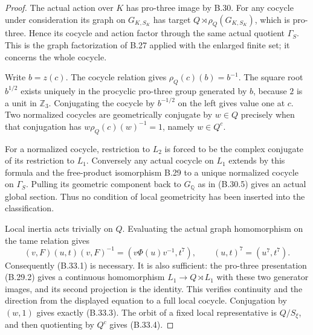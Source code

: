 \begin{proof}
The actual action over $K$ has pro-three image by B.30.
For any cocycle under consideration its graph on
$G_{K,S_K}$ has target $Q\rtimes\rho_Q(G_{K,S_K})$,
which is pro-three.  Hence its cocycle and action factor
through the same actual quotient $\Gamma_S$.
This is the graph factorization of B.27 applied with the
enlarged finite set; it concerns the whole cocycle.

Write $b=z(c)$.  The cocycle relation gives
$\rho_Q(c)(b)=b^{-1}$.  The square root $b^{1/2}$ exists
uniquely in the procyclic pro-three group generated by
$b$, because $2$ is a unit in $\mathbb Z_3$.
Conjugating the cocycle by $b^{-1/2}$ on the left gives
value one at $c$.  Two normalized cocycles are
geometrically conjugate by $w\in Q$ precisely when
that conjugation has $w\rho_Q(c)(w)^{-1}=1$, namely
$w\in Q^c$.

For a normalized cocycle, restriction to $L_2$ is forced
to be the complex conjugate of its restriction to $L_1$.
Conversely any actual cocycle on $L_1$ extends by this
formula and the free-product isomorphism B.29 to a unique
normalized cocycle on $\Gamma_S$.  Pulling its geometric
component back to $G_{\mathbb Q}$ as in (B.30.5) gives
an actual global section.  Thus no condition of local
geometricity has been inserted into the classification.

Local inertia acts trivially on $Q$.  Evaluating the
actual graph homomorphism on the tame relation gives
\[
 (v,F)(u,t)(v,F)^{-1}
        =(v\Phi(u)v^{-1},t^7),\qquad
                         (u,t)^7=(u^7,t^7).
\]
Consequently (B.33.1) is necessary.
It is also sufficient: the pro-three presentation
(B.29.2) gives a continuous homomorphism
$L_1\to Q\rtimes L_1$ with these two generator images,
and its second projection is the identity.
This verifies continuity and the direction from the
displayed equation to a full local cocycle.
Conjugation by $(w,1)$ gives exactly (B.33.3).
The orbit of a fixed local representative is $Q/S_\xi$,
and then quotienting by $Q^c$ gives (B.33.4).


\end{proof}
